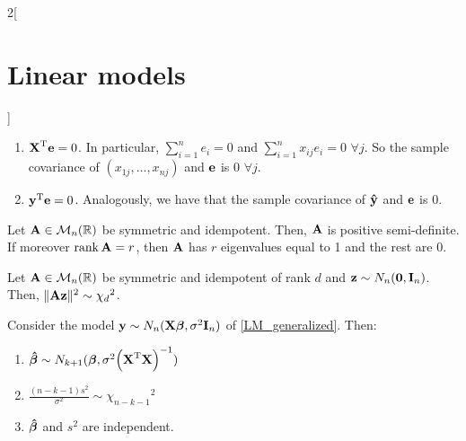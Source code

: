 \documentclass[../../../main_math.tex]{subfiles}
\begin{document}
\begin{multicols}{2}[\section{Linear models}]
\begin{proposition}
\begin{enumerate}
      \item ${\boldsymbol{\mathrm{X}}}^{\mathrm{T}}\boldsymbol{\mathrm{e}}=0$. In particular, $\sum_{i=1}^n e_i=0$ and $\sum_{i=1}^n x_{ij}e_i=0$ $\forall j$. So the sample covariance of $(x_{1j},\ldots,x_{nj})$ and $\boldsymbol{\mathrm{e}}$ is 0 $\forall j$.
      \item ${\boldsymbol{\mathrm{y}}}^{\mathrm{T}}\boldsymbol{\mathrm{e}}=0$. Analogously, we have that the sample covariance of $\boldsymbol{\mathrm{\hat{y}}}$ and $\boldsymbol{\mathrm{e}}$ is 0.
    \end{enumerate}
  \end{proposition}
  \begin{proposition}
    Let $\boldsymbol{\mathrm{A}}\in\mathcal{M}_n(\mathbb{R})$ be symmetric and idempotent. Then, $\boldsymbol{\mathrm{A}}$ is positive semi-definite. If moreover $\rank\boldsymbol{\mathrm{A}} =r$, then $\boldsymbol{\mathrm{A}}$ has $r$ eigenvalues equal to 1 and the rest are 0.
  \end{proposition}
  \begin{lemma}
    Let $\boldsymbol{\mathrm{A}}\in\mathcal{M}_n(\mathbb{R})$ be symmetric and idempotent of rank $d$ and $\boldsymbol{\mathrm{z}}\sim N_n(\boldsymbol{\mathrm{0}},\boldsymbol{\mathrm{I}}_n)$. Then, $\|\boldsymbol{\mathrm{Az}}\|^2\sim{\chi_d}^2$.
  \end{lemma}
  \begin{proposition}
    Consider the model $\boldsymbol{\mathrm{y}}\sim N_n(\boldsymbol{\mathrm{X\beta}},\sigma^2\boldsymbol{\mathrm{I}}_n)$ of \cref{LM_generalized}. Then:
    \begin{enumerate}
      \item $\boldsymbol{\mathrm{\hat\beta}}\sim N_{k+1}(\boldsymbol{\mathrm{\beta}},\sigma^2{\left({\boldsymbol{\mathrm{X}}}^{\mathrm{T}}\boldsymbol{\mathrm{X}}\right)}^{-1})$
      \item $\frac{(n-k-1)s^2}{\sigma^2}\sim{\chi_{n-k-1}}^2$
      \item $\boldsymbol{\mathrm{\hat\beta}}$ and $s^2$ are independent.
    \end{enumerate}
  \end{proposition}
\end{multicols}
\end{document}
